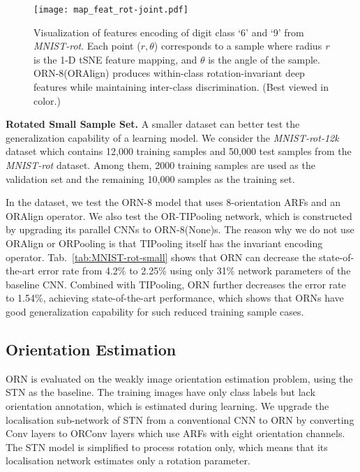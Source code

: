 \documentclass[10pt,twocolumn,letterpaper]{article}
\begin{document}
    \begin{figure}
        \centering
        \texttt{[image: map\_feat\_rot-joint.pdf]}
        \caption{
            Visualization of features encoding of digit class `6' and `9' from \textit{MNIST-rot}. Each point ($r, \theta$) corresponds to a sample where radius \textit{r} is the 1-D tSNE feature mapping, and $\theta$ is the angle of the sample.
            ORN-8(ORAlign) produces within-class rotation-invariant deep features while maintaining inter-class discrimination. (Best viewed in color.)
        }
    \label{fig:RotFeatureVis}
    \vspace{-0.8em}
    \end{figure}

    \textbf{Rotated Small Sample Set.} A smaller dataset can better test the generalization capability of a learning model. We consider the \textit{MNIST-rot-12k} dataset \cite{Larochelle2007} which contains 12,000 training samples and 50,000 test samples from the \textit{MNIST-rot} dataset. Among them, 2000 training samples are used as the validation set and the remaining 10,000 samples as the training set.

    In the dataset, we test the ORN-8 model that uses 8-orientation ARFs and an ORAlign operator. We also test the OR-TIPooling network, which is constructed by upgrading its parallel CNNs to ORN-8(None)s. The reason why we do not use ORAlign or ORPooling is that TIPooling itself has the invariant encoding operator. Tab.~\ref{tab:MNIST-rot-small} shows that ORN can decrease the state-of-the-art error rate from 4.2\% to 2.25\% using only 31\% network parameters of the baseline CNN. Combined with TIPooling, ORN further decreases the error rate to 1.54\%, achieving state-of-the-art performance, which shows that ORNs have good generalization capability for such reduced training sample cases.

\subsection{Orientation Estimation}
\label{sec:MNIST-estimate}
    ORN is evaluated on the weakly image orientation estimation problem, using the STN \cite{Jaderberg2015} as the baseline. The training images have only class labels but lack orientation annotation, which is estimated during learning. We upgrade the localisation sub-network of STN from a conventional CNN to ORN by converting Conv layers to ORConv layers which use ARFs with eight orientation channels. The STN model is simplified to process rotation only, which means that its localisation network estimates only a rotation parameter.
\end{document}
